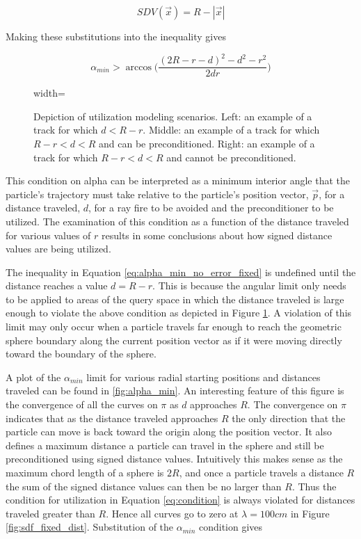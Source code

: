 \begin{equation}
  SDV(\vec{x}) =  R-|\vec{x}|
  \label{eq:sdf_sphere}
\end{equation}

Making these substitutions into the inequality gives

\begin{equation}
  \alpha_{min} > \arccos\Bigg ( \frac{(2R-r-d)^2-d^2-r^2}{2 d r} \Bigg )
  \label{eq:alpha_min_no_error_fixed}
\end{equation}

\begin{figure}[ht]
  \centering
  {width=\textwidth}
  \caption[Depiction of utilization modeling scenarios.]{Depiction of
    utilization modeling scenarios. Left: an example of a track for which $d < R
    - r$. Middle: an example of a track for which $R-r < d < R$ and can be
    preconditioned.  Right: an example of a track for which $R-r < d < R$ and
    cannot be preconditioned.}
  \label{fig:modeling_cases}
\end{figure}

This condition on alpha can be interpreted as a minimum interior angle that the
particle's trajectory must take relative to the particle's position vector,
$\vec{p}$, for a distance traveled, $d$, for a ray fire to be avoided and the
preconditioner to be utilized. The examination of this condition as a function
of the distance traveled for various values of $r$ results in some conclusions
about how signed distance values are being utilized.

The inequality in Equation \eqref{eq:alpha_min_no_error_fixed} is undefined until the distance reaches a value $d = R- r$. This
is because the angular limit only needs to be applied to areas of the query
space in which the distance traveled is large enough to violate the above
condition as depicted in  Figure \ref{fig:modeling_cases}. A violation of this
limit may only occur when a particle travels far enough to reach the geometric
sphere boundary along the current position vector as if it were moving directly
toward the boundary of the sphere.

A plot of the $\alpha_{min}$ limit for various radial starting positions and
distances traveled can be found in \ref{fig:alpha_min}. An interesting feature
of this figure is the convergence of all the curves on $\pi$ as $d$ approaches
$R$. The convergence on $\pi$ indicates that as the distance traveled approaches
$R$ the only direction that the particle can move is back toward the origin
along the position vector. It also defines a maximum distance a particle can
travel in the sphere and still be preconditioned using signed distance
values. Intuitively this makes sense as the maximum chord length of a sphere is
$2R$, and once a particle travels a distance $R$ the sum of the signed distance
values can then be no larger than $R$. Thus the condition for utilization in
Equation \eqref{eq:condition} is always violated for distances traveled greater
than $R$. Hence all curves go to zero at $\lambda
= 100 cm$ in Figure \ref{fig:sdf_fixed_dist}. Substitution of the $\alpha_{min}$
condition gives

